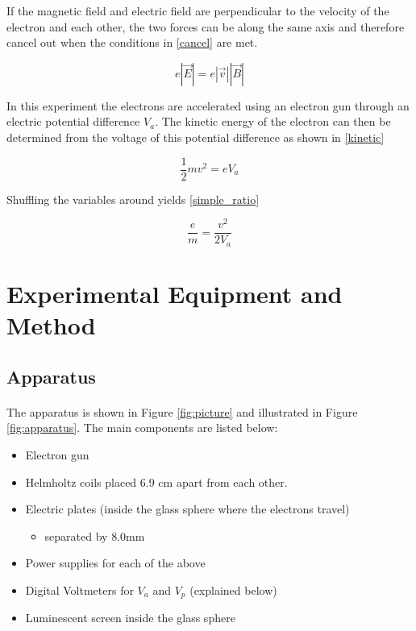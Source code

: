 \documentclass{article}
\begin{document}
If the magnetic field and electric field are perpendicular to the velocity of the electron and each other, the two forces can be along the same axis and therefore cancel out when the conditions in \eqref{cancel}  are met.

\begin{equation}\label{cancel}
  e|\vec{E}| = e|\vec{v}||\vec{B}|
\end{equation}

In this experiment the electrons are accelerated using an electron gun through an electric potential difference \(V_a\). The kinetic energy of the electron can then be determined from the voltage of this potential difference as shown in \eqref{kinetic}

\begin{equation}\label{kinetic}
  \frac{1}{2} m v^2 = eV_a
\end{equation}

Shuffling the variables around yields \eqref{simple_ratio}

\begin{equation}\label{simple_ratio}
  \frac{e}{m} = \frac{v^2}{2V_a}
\end{equation}

\section{Experimental Equipment and Method}
\subsection{Apparatus}
\paragraph{}

The apparatus is shown in Figure \ref{fig:picture} and illustrated in Figure \ref{fig:apparatus}. The main components are listed below:

\begin{itemize}
  \item Electron gun
  \item Helmholtz coils placed 6.9 cm apart from each other.
  \item Electric plates (inside the glass sphere where the electrons travel)
  \begin{itemize}
    \item separated by 8.0mm
  \end{itemize}
  \item Power supplies for each of the above
  \item Digital Voltmeters for \(V_a\) and \(V_p\) (explained below)
  \item Luminescent screen inside the glass sphere
\end{itemize}
\end{document}
